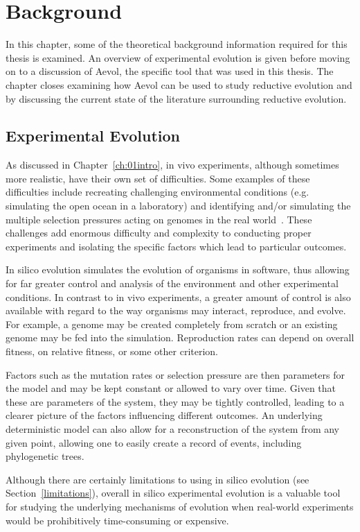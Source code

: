 \chapter{Background}\label{ch:02background}

In this chapter, some of the theoretical background information required for this thesis is examined. An overview of experimental evolution is given before moving on to a discussion of Aevol, the specific tool that was used in this thesis. The chapter closes examining how Aevol can be used to study reductive evolution and by discussing the current state of the literature surrounding reductive evolution.  

\section{Experimental Evolution}
As discussed in Chapter~\ref{ch:01intro}, in vivo experiments, although sometimes more realistic, have their own set of difficulties. Some examples of these difficulties include recreating challenging environmental conditions (e.g. simulating the open ocean in a laboratory) and identifying and/or simulating the multiple selection pressures acting on genomes in the real world~\cite{Batut.2013}. These challenges add enormous difficulty and complexity to conducting proper experiments and isolating the specific factors which lead to particular outcomes. 

In silico evolution simulates the evolution of organisms in software, thus allowing for far greater control and analysis of the environment and other experimental conditions. In contrast to in vivo experiments, a greater amount of control is also available with regard to the way organisms may interact, reproduce, and evolve. For example, a genome may be created completely from scratch or an existing genome may be fed into the simulation. Reproduction rates can depend on overall fitness, on relative fitness, or some other criterion. 

Factors such as the mutation rates or selection pressure are then parameters for the model and may be kept constant or allowed to vary over time. Given that these are parameters of the system, they may be tightly controlled, leading to a clearer picture of the factors influencing different outcomes. An underlying deterministic model can also allow for a reconstruction of the system from any given point, allowing one to easily create a record of events, including phylogenetic trees. 

Although there are certainly limitations to using in silico evolution (see Section~\ref{limitations}), overall in silico experimental evolution is a valuable tool for studying the underlying mechanisms of evolution when real-world experiments would be prohibitively time-consuming or expensive.

